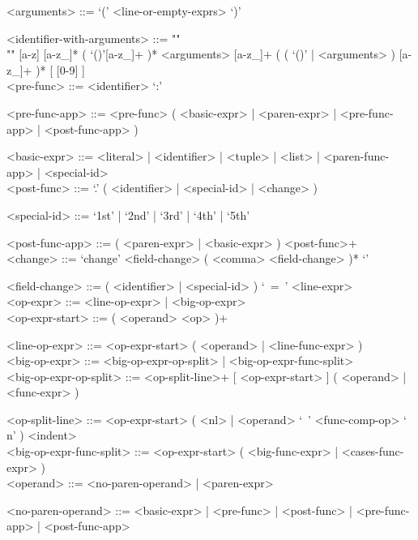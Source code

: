 \documentclass{article}
\begin{document}
\begin{grammar}
<arguments> ::= `(' <line-or-empty-exprs> `)'

<identifier-with-arguments> ::= ""\\""
[a-z] [a-z_]* ( `()'[a-z_]+ )* <arguments>
[a-z_]+ ( ( `()' | <arguments> ) [a-z_]+ )* 
[ [0-9] ]
\\

<pre-func> ::= <identifier> `:'

<pre-func-app> ::=
<pre-func> ( <basic-expr> | <paren-expr> | <pre-func-app> | <post-func-app> )

<basic-expr> ::=
<literal> | <identifier> | <tuple> | <list> | <paren-func-app> | <special-id>
\\

<post-func> ::= `.' ( <identifier> | <special-id> | <change> )

<special-id> ::= `1st' | `2nd' | `3rd' | `4th' | `5th'

<post-func-app> ::= ( <paren-expr> | <basic-expr> ) <post-func>+
\\

<change> ::= `change{' <field-change> ( <comma> <field-change> )* `}'

<field-change> ::= ( <identifier> | <special-id> ) `\ =\ ' <line-expr>
\\

<op-expr> ::= <line-op-expr> | <big-op-expr>
\\

<op-expr-start> ::= ( <operand> <op> )+

<line-op-expr> ::= <op-expr-start> ( <operand> | <line-func-expr> )
\\

<big-op-expr> ::= 
<big-op-expr-op-split> | <big-op-expr-func-split>
\\

<big-op-expr-op-split> ::= 
<op-split-line>+ [ <op-expr-start> ] ( <operand> | <func-expr> )

<op-split-line> ::=
<op-expr-start> ( <nl> | <operand> `\ ' <func-comp-op> `\\n' ) <indent> 
\\

<big-op-expr-func-split> ::= <op-expr-start> ( <big-func-expr> | <cases-func-expr> )
\\

<operand> ::= <no-paren-operand> | <paren-expr>

<no-paren-operand> ::=
<basic-expr> | <pre-func> | <post-func> | <pre-func-app> | <post-func-app>
\\


\end{grammar}
\end{document}
